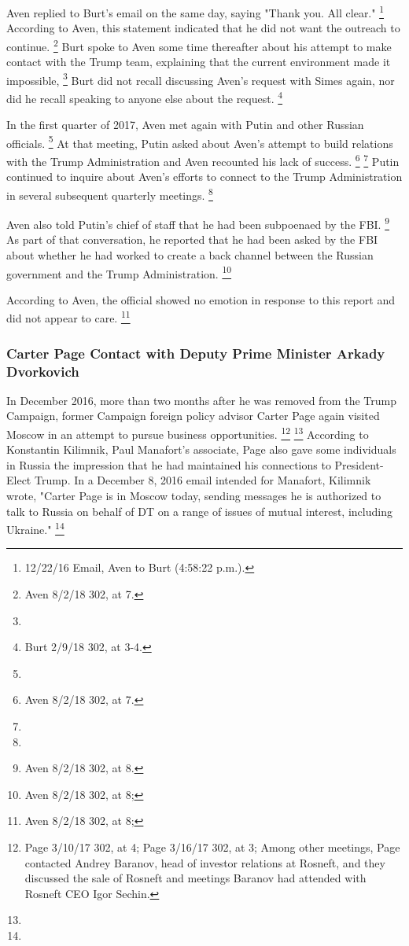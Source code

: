 Aven replied to Burt's email on the same day, saying "Thank you. All clear."%
\footnote{12/22/16 Email, Aven to Burt (4:58:22 p.m.).}
According to Aven, this statement indicated that he did not want the outreach to continue.%
\footnote{Aven 8/2/18 302, at 7.}
Burt spoke to Aven some time thereafter about his attempt to make contact with the Trump team, explaining that the current environment made it impossible,
\footnote{}
Burt did not recall discussing Aven's request with Simes again, nor did he recall speaking to anyone else about the request.%
\footnote{Burt 2/9/18 302, at 3-4.}

In the first quarter of 2017, Aven met again with Putin and other Russian officials.%
\footnote{}
At that meeting, Putin asked about Aven's attempt to build relations with the Trump Administration and Aven recounted his lack of success.%
\footnote{ Aven 8/2/18 302, at 7.}
\footnote{}
Putin continued to inquire about Aven's efforts to connect to the Trump Administration in several subsequent quarterly meetings.%
\footnote{}

Aven also told Putin's chief of staff that he had been subpoenaed by the FBI.%
\footnote{Aven 8/2/18 302, at 8.}
As part of that conversation, he reported that he had been asked by the FBI about whether he had worked to create a back channel between the Russian government and the Trump Administration.%
\footnote{Aven 8/2/18 302, at 8; }

According to Aven, the official showed no emotion in response to this report and did not appear to care.%
\footnote{Aven 8/2/18 302, at 8; }

\subsubsection{Carter Page Contact with Deputy Prime Minister Arkady Dvorkovich}

In December 2016, more than two months after he was removed from the Trump Campaign, former Campaign foreign policy advisor Carter Page again visited Moscow in an attempt to pursue business opportunities.%
\footnote{Page 3/10/17 302, at 4;
Page 3/16/17 302, at 3;
 Among other meetings, Page contacted Andrey Baranov, head of investor relations at Rosneft, and they discussed the sale of Rosneft and meetings Baranov had attended with Rosneft CEO Igor Sechin.
}
\footnote{}
According to Konstantin Kilimnik, Paul Manafort's associate, Page also gave some individuals in Russia the impression that he had maintained his connections to President-Elect Trump.
In a December 8, 2016 email intended for Manafort, Kilimnik wrote, "Carter Page is in Moscow today, sending messages he is authorized to talk to Russia on behalf of DT on a range of issues of mutual interest, including Ukraine."%
\footnote{}

